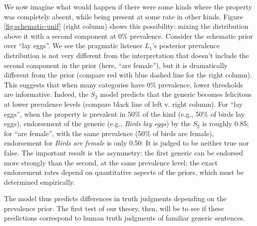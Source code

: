 \documentclass[12pt,letterpaper]{article}
\begin{document}
We now imagine what would happen if there were some kinds where the property was completely absent, while being present at some rate in other kinds.
Figure \ref{fig:schematic-unif} (right column) shows this possibility: mixing the distribution above it with a second component at 0\% prevalence.
Consider the schematic prior over ``lay eggs''.
We see the pragmatic listener $L_1$'s posterior prevalence distribution is not very different from the interpretation that doesn't include the second component in the prior (here, ``are female''), but it is dramatically different from the prior (compare red with blue dashed line for the right column).
This suggests that when many categories have 0\% prevalence, lower thresholds are informative. 
Indeed, the $S_2$ model predicts that the generic becomes felicitous at lower prevalence levels (compare black line of left v. right column).
For ``lay eggs'', when the property is prevalent in 50\% of the kind (e.g., 50\% of birds lay eggs), endorsement of the generic (e.g., \emph{Birds lay eggs}) by the $S_2$ is roughly 0.85; for ``are female'', with the same prevalence (50\% of birds are female), endorsement for \emph{Birds are female} is only 0.50: It is judged to be neither true nor false. 
The important result is the asymmetry: the first generic can be endorsed more strongly than the second, at the same prevalence level; the exact endorsement rates depend on quantitative aspects of the priors, which must be determined empirically.


%    



The model thus predicts differences in truth judgments depending on the prevalence prior. 
The first test of our theory, then, will be to see if these predictions correspond to human truth judgments of familiar generic sentences. 
\end{document}
